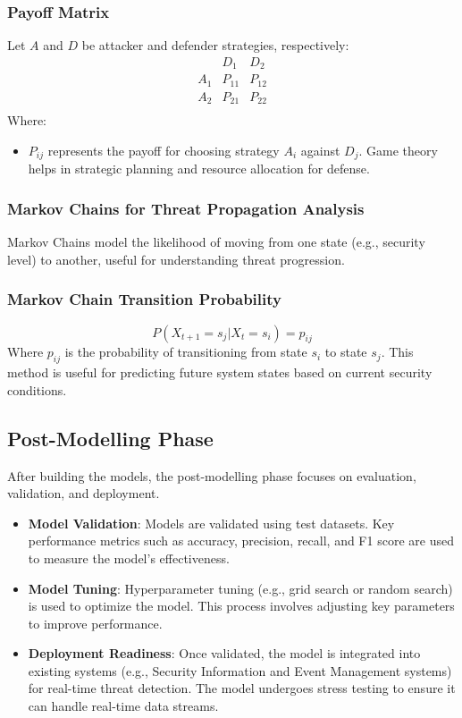 \documentclass[a4paper,twoside,12pt]{report}
\begin{document}
\subsubsection{Payoff Matrix}
Let \( A \) and \( D \) be attacker and defender strategies, respectively:
\[
\begin{array}{c|cc}
      & D_1 & D_2 \\
\hline
A_1 & P_{11} & P_{12} \\
A_2 & P_{21} & P_{22} \\
\end{array}
\]
Where:
\begin{itemize}
    \item \( P_{ij} \) represents the payoff for choosing strategy \( A_i \) against \( D_j \). Game theory helps in strategic planning and resource allocation for defense.
\end{itemize}

\subsubsection{Markov Chains for Threat Propagation Analysis}
Markov Chains model the likelihood of moving from one state (e.g., security level) to another, useful for understanding threat progression.

\subsubsection{Markov Chain Transition Probability}
\[
P(X_{t+1} = s_j | X_t = s_i) = p_{ij}
\]
Where \( p_{ij} \) is the probability of transitioning from state \( s_i \) to state \( s_j \). This method is useful for predicting future system states based on current security conditions.

\subsection{Post-Modelling Phase}
After building the models, the post-modelling phase focuses on evaluation, validation, and deployment.

\begin{itemize}
    \item \textbf{Model Validation}: Models are validated using test datasets. Key performance metrics such as accuracy, precision, recall, and F1 score are used to measure the model’s effectiveness.
    \item \textbf{Model Tuning}: Hyperparameter tuning (e.g., grid search or random search) is used to optimize the model. This process involves adjusting key parameters to improve performance.
    \item \textbf{Deployment Readiness}: Once validated, the model is integrated into existing systems (e.g., Security Information and Event Management systems) for real-time threat detection. The model undergoes stress testing to ensure it can handle real-time data streams.
\end{itemize}
\end{document}
